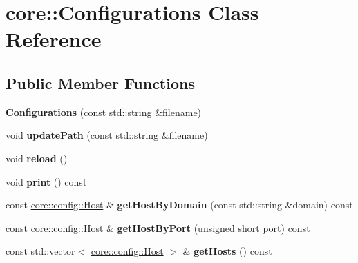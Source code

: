 \hypertarget{classcore_1_1Configurations}{}\section{core\+:\+:Configurations Class Reference}
\label{classcore_1_1Configurations}
\subsection*{Public Member Functions}
\begin{DoxyCompactItemize}
\item 
\mbox{\label{classcore_1_1Configurations_a162460996859d9182b1dd9b146d22639}} 
{\bfseries Configurations} (const std\+::string \&filename)
\item 
\mbox{\label{classcore_1_1Configurations_a6b1904b8f7e31a707dff507d610776f8}} 
void {\bfseries update\+Path} (const std\+::string \&filename)
\item 
\mbox{\label{classcore_1_1Configurations_a99bb4c3ad7d0a1d0bd88469937a11df7}} 
void {\bfseries reload} ()
\item 
\mbox{\label{classcore_1_1Configurations_abc8a042d0f01de39311c8b12f3bb7caa}} 
void {\bfseries print} () const
\item 
\mbox{\label{classcore_1_1Configurations_a2a2ef7171b6c8b98f8adb4f0a63a5bf8}} 
const \hyperlink{classcore_1_1config_1_1Host}{core\+::config\+::\+Host} \& {\bfseries get\+Host\+By\+Domain} (const std\+::string \&domain) const
\item 
\mbox{\label{classcore_1_1Configurations_a651e5195e625473c4994f9e7e7b4fa14}} 
const \hyperlink{classcore_1_1config_1_1Host}{core\+::config\+::\+Host} \& {\bfseries get\+Host\+By\+Port} (unsigned short port) const
\item 
\mbox{\label{classcore_1_1Configurations_ad95b237ce411d5a442647ff53b9e80f1}} 
const std\+::vector$<$ \hyperlink{classcore_1_1config_1_1Host}{core\+::config\+::\+Host} $>$ \& {\bfseries get\+Hosts} () const
\end{DoxyCompactItemize}
